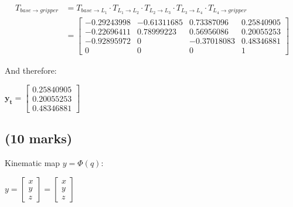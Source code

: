 \begin{align*}
    T_{base \rightarrow gripper} &=
        T_{base \rightarrow L_1} \cdot
        T_{L_1 \rightarrow L_2} \cdot
        T_{L_2 \rightarrow L_3} \cdot
        T_{L_3 \rightarrow L_4} \cdot
        T_{L_4 \rightarrow gripper}\\
        &=
        \begin{bmatrix}
            -0.29243998 & -0.61311685 &  0.73387096 & 0.25840905 \\
            -0.22696411 &  0.78999223 &  0.56956086 & 0.20055253 \\
            -0.92895972 &  0          & -0.37018083 & 0.48346881 \\
             0          &  0          &  0          & 1
        \end{bmatrix}
\end{align*}

And therefore:

\begin{center}
    $ \boldsymbol{y_t} =
        \begin{bmatrix}
            0.25840905 \\
            0.20055253 \\
            0.48346881
        \end{bmatrix} $
\end{center}

\clearpage


\subsection{(10 marks)}

Kinematic map $ y = \Phi(q) $:

\begin{center}
    $ y =
        \begin{bmatrix}
            x \\
            y \\
            z
        \end{bmatrix}
        =
        \begin{bmatrix}
            x \\
            y \\
            z
        \end{bmatrix} $
\end{center}

